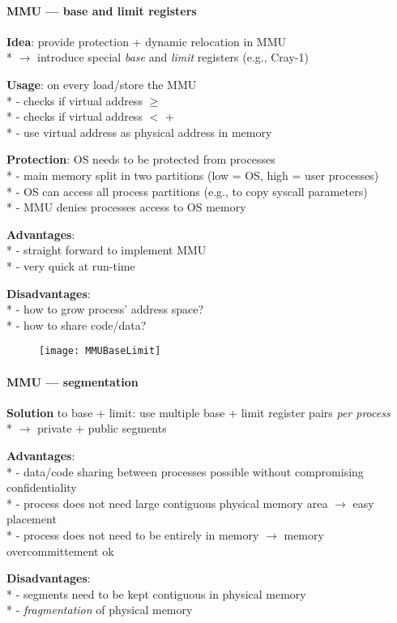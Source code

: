 \paragraph{MMU --- base and limit registers}
\begin{items}
  \item \textbf{Idea}: provide protection + dynamic relocation in MMU \\*
    \( \to \) introduce special \emph{base} and \emph{limit} registers (e.g., Cray-1)
  \item \textbf{Usage}: on every load/store the MMU \\*
    - checks if virtual address \( \geq \)  \\*
    - checks if virtual address \( < \)  +  \\*
    - use virtual address as physical address in memory
  \item \textbf{Protection}: OS needs to be protected from processes \\*
    - main memory split in two partitions (low = OS, high = user processes) \\*
    - OS can access all process partitions (e.g., to copy syscall parameters) \\*
    - MMU denies processes access to OS memory
  \item \textbf{Advantages}: \\*
    - straight forward to implement MMU \\*
    - very quick at run-time
  \item \textbf{Disadvantages}: \\*
    - how to grow process' address space? \\*
    - how to share code/data?
\end{items}
\begin{figure}[H]\centering\label{MMUBaseLimit}\texttt{[image: MMUBaseLimit]}\end{figure}

\paragraph{MMU --- segmentation}
\begin{items}
  \item \textbf{Solution} to base + limit: use multiple base + limit register pairs \emph{per process} \\*
  \( \to \) private + public segments
  \item \textbf{Advantages}: \\*
    - data/code sharing between processes possible without compromising confidentiality \\*
    - process does not need large contiguous physical memory area \( \to \) easy placement \\*
    - process does not need to be entirely in memory \( \to \) memory overcommittement ok
  \item \textbf{Disadvantages}: \\*
    - segments need to be kept contiguous in physical memory \\*
    - \emph{fragmentation} of physical memory
\end{items}

